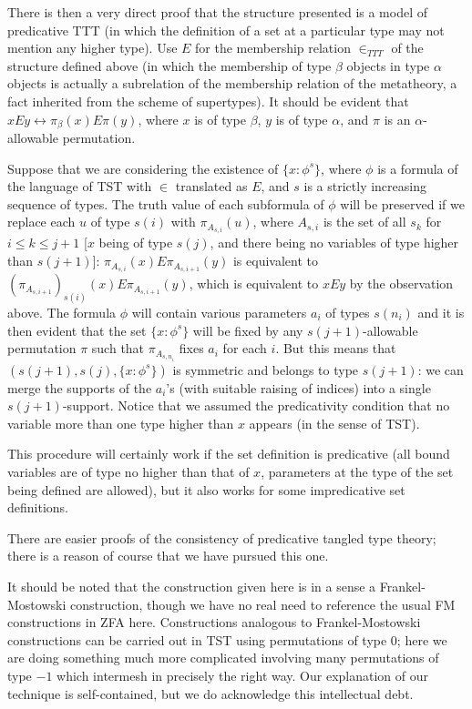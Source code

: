 \documentclass[112pt]{article}
\begin{document}
There is then a very direct proof that the structure presented is a model of predicative TTT (in which the definition of a set at a particular type may not mention any higher type).  Use $E$ for the membership relation $\in_{TTT}$ of the structure defined above (in which the membership of type $\beta$ objects in type $\alpha$ objects is actually a subrelation of the membership relation of the metatheory, a fact inherited from the scheme of supertypes).  It should be evident that $x E y \leftrightarrow \pi_\beta(x) E \pi(y)$,
where $x$ is of type $\beta$, $y$ is of type $\alpha$, and $\pi$ is an $\alpha$-allowable permutation.

Suppose that we are considering the existence of $\{x : \phi^s\}$, where $\phi$ is a formula of the language of TST with $\in$ translated as $E$, and $s$ is a strictly increasing sequence of types.  The truth value of each subformula of $\phi$ will be preserved if we replace each $u$ of type $s(i)$ with $\pi_{A_{s,i}}(u)$, where  $A_{s,i}$ is the set of all $s_k$ for $i \leq k \leq j+1$ [$x$ being of type $s(j)$, and there being no variables of type higher than $s(j+1)$]:  $\pi_{A_{s,i}}(x) E  \pi_{A_{s,i+1}}(y)$ is equivalent to $(\pi_{A_{s,i+1}})_{s(i)}(x) E \pi_{A_{s,i+1}}(y)$, which is equivalent to $xEy$ by the observation above. The formula $\phi$ will contain various parameters $a_i$ of types $s(n_i)$ and it is then evident that the set $\{x : \phi^s\}$ will be fixed by any $s(j+1)$-allowable permutation $\pi$ such that $\pi_{A_{s,n_i}}$ fixes $a_i$ for each $i$.  But this means that
$(s(j+1),s(j),\{x : \phi^s\})$ is symmetric and belongs to type $s(j+1)$:  we can merge the supports of the $a_i$'s (with suitable raising of indices) into a single $s(j+1)$-support.  Notice that we assumed the predicativity condition that no variable more than one type higher than $x$ appears (in the sense of TST).

This procedure will certainly work if the set definition is predicative (all bound variables are of type no higher than that of $x$, parameters at the type
of the set being defined are allowed), but it also works for some impredicative set definitions.

There are easier proofs of the consistency of predicative tangled type theory;  there is a reason of course that we have pursued this one.

It should be noted that the construction given here is in a sense a Frankel-Mostowski construction, though we have no real need to reference the usual
FM constructions in ZFA here.  Constructions analogous to Frankel-Mostowski constructions can be carried out in TST using permutations of type 0;  here we are doing something much more complicated involving many permutations of type $-1$ which intermesh in precisely the right way.  Our explanation of our technique is self-contained, but we do acknowledge this intellectual debt.
\end{document}
